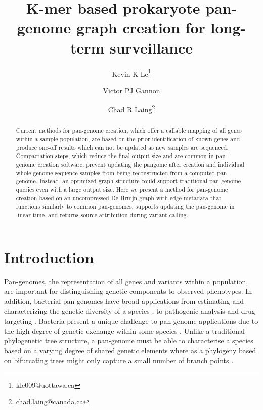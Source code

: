 \documentclass{article}
\begin{document}
\title{K-mer based prokaryote pan-genome graph creation for long-term surveillance}

\author[1]{Kevin K Le\thanks{kle009@uottawa.ca}}
\author[1]{Victor PJ Gannon}
\author[2]{Chad R Laing\thanks{chad.laing@canada.ca}}

\renewcommand\Authands{ and }

\maketitle

\begin{abstract}

Current methods for pan-genome creation, which offer a callable mapping of all genes within a sample population, are based on the prior identification of known genes and produce one-off results which can not be updated as new samples are sequenced.
Compactation steps, which reduce the final output size and are common in pan-genome creation software, prevent updating the pangome after creation and individual whole-genome sequence samples from being reconstructed from a computed pan-genome.
Instead, an optimized graph structure could support traditional pan-genome queries even with a large output size.
Here we present a method for pan-genome creation based on an uncompressed De-Bruijn graph with edge metadata that functions similarly to common pan-genomes, supports updating the pan-genome in linear time, and returns source attribution during variant calling.


\end{abstract}


\section{Introduction}

Pan-genomes, the representation of all genes and variants within a population, are important for distinguishing genetic components to observed phenotypes.
In addition, bacterial pan-genomes have broad applications from estimating and characterizing the genetic diversity of a species \cite{medini2005microbial}, to pathogenic analysis \cite{tettelin2005genome, rasko2008pangenome} and drug targeting \cite{muzzi2007pan}.
Bacteria present a unique challenge to pan-genome applications due to the high degree of genetic exchange within some species \cite{medini2005microbial}.
Unlike a traditional phylogenetic tree structure, a pan-genome must be able to characterise a species based on a varying degree of shared genetic elements where as a phylogeny based on bifurcating trees might only capture a small number of branch points \cite{vernikos2015ten}.
\end{document}
